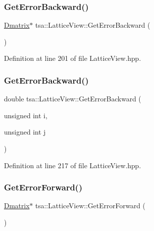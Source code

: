 \subsubsection{\texorpdfstring{Get\+Error\+Backward()}{GetErrorBackward()}\hspace{0.1cm}{\footnotesize\ttfamily [1/2]}}
{\footnotesize\ttfamily \hyperlink{namespacetsa_ad260cd21c1891c4ed391fe788569aba4}{Dmatrix}$\ast$ tsa\+::\+Lattice\+View\+::\+Get\+Error\+Backward (\begin{DoxyParamCaption}{ }\end{DoxyParamCaption})\hspace{0.3cm}{\ttfamily [inline]}}



Definition at line 201 of file Lattice\+View.\+hpp.

\mbox{\label{classtsa_1_1_lattice_view_ae0bdb3cfb70274cf21c8681393d92a45}} 
\subsubsection{\texorpdfstring{Get\+Error\+Backward()}{GetErrorBackward()}\hspace{0.1cm}{\footnotesize\ttfamily [2/2]}}
{\footnotesize\ttfamily double tsa\+::\+Lattice\+View\+::\+Get\+Error\+Backward (\begin{DoxyParamCaption}\item[{unsigned int}]{i,  }\item[{unsigned int}]{j }\end{DoxyParamCaption})\hspace{0.3cm}{\ttfamily [inline]}}



Definition at line 217 of file Lattice\+View.\+hpp.

\mbox{\label{classtsa_1_1_lattice_view_a893dd18c7f1d423a8478a786c3c731c5}} 
\subsubsection{\texorpdfstring{Get\+Error\+Forward()}{GetErrorForward()}\hspace{0.1cm}{\footnotesize\ttfamily [1/2]}}
{\footnotesize\ttfamily \hyperlink{namespacetsa_ad260cd21c1891c4ed391fe788569aba4}{Dmatrix}$\ast$ tsa\+::\+Lattice\+View\+::\+Get\+Error\+Forward (\begin{DoxyParamCaption}{ }\end{DoxyParamCaption})\hspace{0.3cm}{\ttfamily [inline]}}



